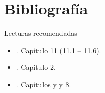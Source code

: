 \documentclass[9pt, aspectratio=169]{beamer}
\begin{document}
\section*{Bibliografía}
\begin{frame}[allowframebreaks]{Lecturas recomendadas}
\begin{itemize}
 \item {}. Capítulo 11 (11.1 -- 11.6).
 \item {}. Capítulo 2.
 \item {}. Capítulos y y 8.
\end{itemize}

\end{frame}
\end{document}
